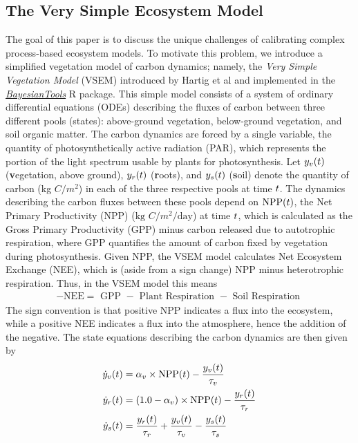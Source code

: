 \documentclass[12pt]{article}
\begin{document}
\subsection{The Very Simple Ecosystem Model}
The goal of this paper is to discuss the unique challenges of calibrating complex process-based ecosystem models. To motivate this problem, we introduce 
a simplified vegetation model of carbon dynamics; namely, the \textit{Very Simple Vegetation Model} (VSEM) introduced by Hartig et al and implemented 
in the \href{https://github.com/florianhartig/BayesianTools}{\textit{BayesianTools}} R package. 
This simple model consists of a system of ordinary differential equations (ODEs) describing the fluxes of carbon between three different pools (states): 
above-ground vegetation, below-ground vegetation, and soil organic matter. The carbon dynamics are forced by a single variable, the quantity of photosynthetically 
active radiation (PAR), which represents the portion of the light spectrum usable by plants for photosynthesis. 
Let $y_v(t)$ (\textbf{v}egetation, above ground), $y_r(t)$ (\textbf{r}oots), and $y_s(t)$ (\textbf{s}oil) denote the quantity of carbon (kg $C/m^2$) in each of the three respective pools at time $t$. 
The dynamics describing the carbon fluxes between these pools depend on $\text{NPP}(t)$, the Net Primary Productivity (NPP) ($\text{kg } C/m^2/\text{day}$) at time $t$, 
which is calculated as the Gross Primary Productivity (GPP) minus carbon released due to autotrophic respiration, where GPP quantifies the amount of carbon 
fixed by vegetation during photosynthesis. Given NPP, the VSEM model calculates Net Ecosystem Exchange (NEE), which is (aside from a sign change) 
NPP minus heterotrophic 
respiration. Thus, in the VSEM model this means 
\begin{align}
-\text{NEE} = \text{ GPP } - \text{ Plant Respiration } - \text{ Soil Respiration } 
\end{align}
The sign convention is that positive NPP indicates a flux into the ecosystem, while a positive NEE indicates a flux into the atmosphere, hence the addition of the negative. 
The state equations describing the carbon dynamics are then given by
\begin{align}
\dot{y}_v(t) &= \alpha_v \times \text{NPP}(t) - \frac{y_v(t)}{\tau_v} \label{VSEM_ODE_system} \\
\dot{y}_r(t) &= (1.0 - \alpha_v) \times \text{NPP}(t) - \frac{y_r(t)}{\tau_r} \nonumber \\
\dot{y}_s(t) &= \frac{y_r(t)}{\tau_r} + \frac{y_v(t)}{\tau_v} - \frac{y_s(t)}{\tau_s} \nonumber 
\end{align}
\end{document}
